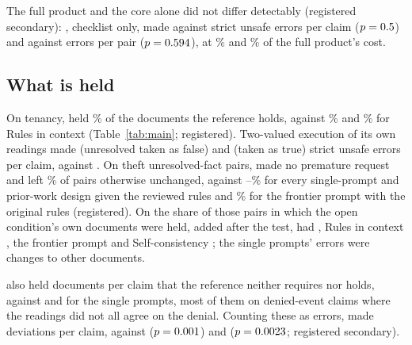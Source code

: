 The full product and the core alone did not differ detectably (registered secondary): \casepath, checklist only, made \sthreeChecklistTenStrict{} against \sthreeCasePathTenStrict{} strict unsafe errors per claim ($p= 0.5$) and \sthreeChecklistThErrors{} against \sthreeCasePathThErrors{} errors per pair ($p= 0.594$), at \sthreeCostChecklistShareTen\% and \sthreeCostChecklistShareTh\% of the full product's cost.

\subsection{What is held}
\label{sec:test-held}

On tenancy, \casepath held \sthreeCasePathTenCorrectHold\% of the documents the reference holds, against \sthreeRicTenCorrectHold\% and \sthreeRicFrontierTenCorrectHold\% for Rules in context (Table~\ref{tab:main}; registered). Two-valued execution of its own readings made \sthreeTwoValFalseTenStrict{} (unresolved taken as false) and \sthreeTwoValTrueTenStrict{} (taken as true) strict unsafe errors per claim, against \sthreeCasePathTenStrict. On theft unresolved-fact pairs, \casepath made no premature request and left \sthreeCasePathThOpenUnchanged\% of pairs otherwise unchanged, against \sthreeRicThOpenUnchanged--\sthreeReactThOpenUnchanged\% for every single-prompt and prior-work design given the reviewed rules and \sthreeRicOrigFrontierThOpenUnchanged\% for the frontier prompt with the original rules (registered). On the share of those pairs in which the open condition's own documents were held, added after the test, \casepath had \sthreeFOneThCasePathOpenHeld, Rules in context \sthreeFOneThRicOpenHeld, the frontier prompt \sthreeFOneThRicFrontierOpenHeld{} and Self-consistency \sthreeFOneThSelfConsOpenHeld; the single prompts' errors were changes to other documents.

\casepath also held \sthreeCasePathTenSpurHold{} documents per claim that the reference neither requires nor holds, against \sthreeRicTenSpurHold{} and \sthreeRicFrontierTenSpurHold{} for the single prompts, most of them on denied-event claims where the readings did not all agree on the denial. Counting these as errors, \casepath made \sthreeCasePathTenAllDev{} deviations per claim, against \sthreeRicTenAllDev{} ($p= 0.001$) and \sthreeRicFrontierTenAllDev{} ($p= 0.0023$; registered secondary).

